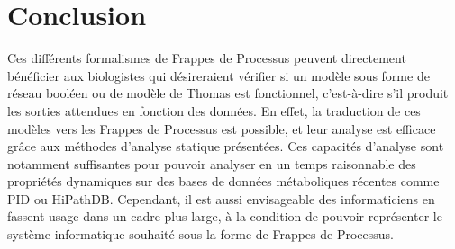 
\chapter{Conclusion}

Ces différents formalismes de Frappes de Processus
peuvent directement bénéficier aux biologistes qui désireraient
vérifier si un modèle sous forme de réseau booléen ou de modèle de Thomas est fonctionnel,
c'est-à-dire s'il produit les sorties attendues en fonction des données.
En effet, la traduction de ces modèles vers les Frappes de Processus est possible,
et leur analyse est efficace grâce aux méthodes d'analyse statique présentées.
Ces capacités d'analyse sont notamment suffisantes pour pouvoir analyser
en un temps raisonnable des propriétés dynamiques sur des bases de données métaboliques récentes
comme PID ou HiPathDB. \tocite
Cependant, il est aussi envisageable des informaticiens en fassent usage dans un cadre plus large,
à la condition de pouvoir représenter le système informatique souhaité
sous la forme de Frappes de Processus.
